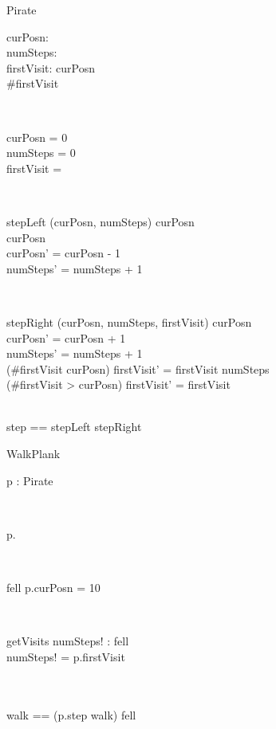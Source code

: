 \documentclass[11pt,a4paper]{article}
\begin{document}
\begin{class}{Pirate}
\also
	\begin{state}
		curPosn: \nat \\
		numSteps: \nat \\
		firstVisit: \seq \nat
	\where
		curPosn  \\
		\#firstVisit 
	\end{state} \\
	\begin{init}
		curPosn = 0 \\
		numSteps = 0 \\
		firstVisit = \langle \rangle
	\end{init} \\
	\begin{op}{stepLeft}
		\Delta (curPosn, numSteps)
	\where	
	        curPosn  \\
		curPosn \neq 10 \\
		curPosn' = curPosn - 1 \\
		numSteps' = numSteps + 1 \\
	\end{op} \\
	\begin{op}{stepRight}
		\Delta (curPosn, numSteps, firstVisit)
	\where
	        curPosn  \\
        	curPosn' = curPosn + 1 \\
	        numSteps' = numSteps + 1 \\
		(\#firstVisit \leq curPosn) \implies firstVisit' = firstVisit \cat
			\langle numSteps \rangle \\
		(\#firstVisit > curPosn) \implies firstVisit' = firstVisit
	\end{op} \\
	step == stepLeft \gch stepRight
	\end{class}

\begin{class}{WalkPlank}
\also
        \begin{state}
                p : Pirate
        \end{state} \\
	\begin{init}
		p.\Init
	\end{init}\\
	\begin{op}{fell}
        \where
		p.curPosn = 10
	\end{op} \\
	\begin{op}{getVisits}
		numSteps! : \seq \nat
	\where
		fell \\
		numSteps! = p.firstVisit
	\end{op} \\
	\\
        walk == (p.step \semi walk) \gch fell
\end{class}
\end{document}
